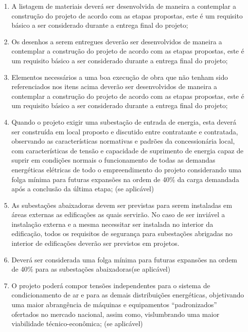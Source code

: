 \begin{enumerate}
	\item A listagem de materiais deverá ser desenvolvida de maneira a contemplar a construção do projeto de acordo com as etapas propostas, este é um requisito básico a ser considerado durante a entrega final do projeto;
	
	\item Os desenhos a serem entregues deverão ser desenvolvidos de maneira a contemplar a construção do projeto de acordo com as etapas propostas, este é um requisito básico a ser considerado durante a entrega final do projeto;
	
	\item Elementos necessários a uma boa execução de obra que não tenham sido referenciados nos itens acima deverão ser desenvolvidos de maneira a contemplar a construção do projeto de acordo com as etapas propostas, este é um requisito básico a ser considerado durante a entrega final do projeto;
	
	\item Quando o projeto exigir uma subestação de entrada de energia, esta deverá ser construída em local proposto e discutido entre contratante e contratada, observando as características normativas e padrões da concessionária local, com características de tensão e capacidade de suprimento de energia capaz de suprir em condições normais o funcionamento de todas as demandas energéticas elétricas de todo o empreendimento do projeto considerando uma folga mínima para futuras expansões na ordem de 40\% da carga demandada após a conclusão da última etapa; (se aplicável)
	
	\item As subestações abaixadoras devem ser previstas para serem instaladas em áreas externas as edificações as quais servirão. No caso de ser inviável a instalação externa e a mesma necessitar ser instalada no interior da edificação, todos os requisitos de segurança para subestações abrigadas no interior de edificações deverão ser previstos em projetos.
	
	\item Deverá ser considerada uma folga mínima para futuras expansões na ordem de 40\% para as subestações abaixadoras(se aplicável)
	
	\item O projeto poderá compor tensões independentes para o sistema de condicionamento de ar e para as demais distribuições energéticas, objetivando uma maior abrangência de máquinas e equipamentos “padronizados” ofertados no mercado nacional, assim como, vislumbrando uma maior viabilidade técnico-econômica; (se aplicável)
	

\end{enumerate}
